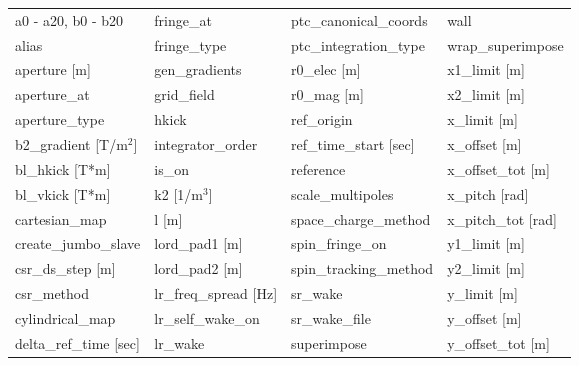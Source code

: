  \begin{tabular}{llll} \toprule
a0 - a20, b0 - b20               & fringe_at                        & ptc_canonical_coords             & wall                             \\
alias                            & fringe_type                      & ptc_integration_type             & wrap_superimpose                 \\
aperture [m]                     & gen_gradients                    & r0_elec [m]                      & x1_limit [m]                     \\
aperture_at                      & grid_field                       & r0_mag [m]                       & x2_limit [m]                     \\
aperture_type                    & hkick                            & ref_origin                       & x_limit [m]                      \\
b2_gradient [T/m$^2$]            & integrator_order                 & ref_time_start [sec]             & x_offset [m]                     \\
bl_hkick [T*m]                   & is_on                            & reference                        & x_offset_tot [m]                 \\
bl_vkick [T*m]                   & k2 [1/m$^3$]                     & scale_multipoles                 & x_pitch [rad]                    \\
cartesian_map                    & l [m]                            & space_charge_method              & x_pitch_tot [rad]                \\
create_jumbo_slave               & lord_pad1 [m]                    & spin_fringe_on                   & y1_limit [m]                     \\
csr_ds_step [m]                  & lord_pad2 [m]                    & spin_tracking_method             & y2_limit [m]                     \\
csr_method                       & lr_freq_spread [Hz]              & sr_wake                          & y_limit [m]                      \\
cylindrical_map                  & lr_self_wake_on                  & sr_wake_file                     & y_offset [m]                     \\
delta_ref_time [sec]             & lr_wake                          & superimpose                      & y_offset_tot [m]                 \\

\end{tabular}
